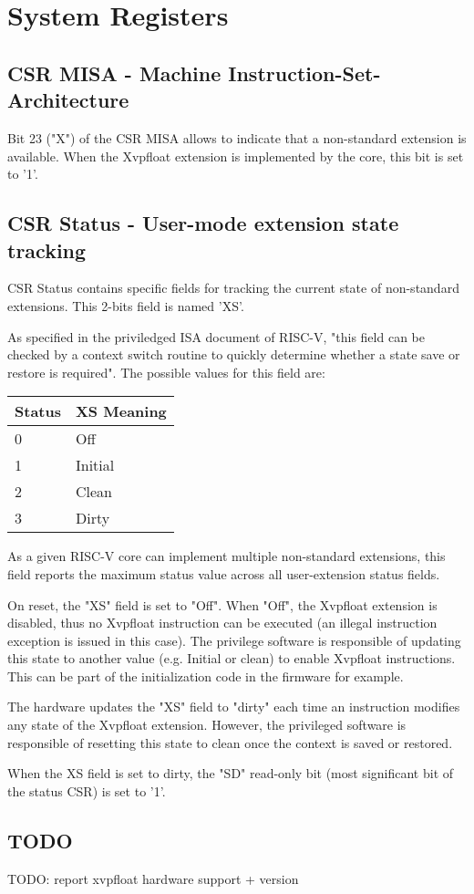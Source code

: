 \chapter{System Registers}

\section{CSR MISA - Machine Instruction-Set-Architecture}

Bit 23 ("X") of the CSR MISA allows to indicate that a non-standard extension is available. When the Xvpfloat extension is implemented by the core, this bit is set to '1'.

\section{CSR Status - User-mode extension state tracking}

CSR Status contains specific fields for tracking the current state of non-standard extensions. This 2-bits field is named 'XS'.

As specified in the priviledged ISA document of RISC-V\cite{riscvptr}, "this field can be checked by a context switch routine to quickly determine whether a state save or restore is required". The possible values for this field are:

\begin{center}
\begin{tabular}{|l|l|}
\hline
Status & XS Meaning \\
\hline
0 & Off \\
\hline
1 & Initial \\
\hline
2 & Clean \\
\hline
3 & Dirty \\
\hline
\end{tabular}
\end{center}

As a given RISC-V core can implement multiple non-standard extensions, this field reports the maximum status value across all user-extension status fields.

On reset, the "XS" field is set to "Off". When "Off", the Xvpfloat extension is disabled, thus no Xvpfloat instruction can be executed (an illegal instruction exception is issued in this case). The privilege software is responsible of updating this state to another value (e.g. Initial or clean) to enable Xvpfloat instructions. This can be part of the initialization code in the firmware for example.

The hardware updates the "XS" field to "dirty" each time an instruction modifies any state of the Xvpfloat extension. However, the privileged software is responsible of resetting this state to clean once the context is saved or restored.

When the XS field is set to dirty, the "SD" read-only bit (most significant bit of the status CSR) is set to '1'.

\section{TODO}

TODO: report xvpfloat hardware support + version
